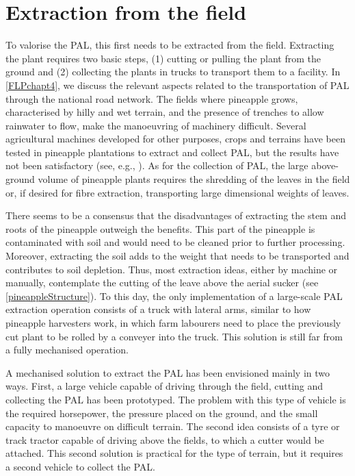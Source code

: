 \section{Extraction from the field}

To valorise the PAL, this first needs to be extracted from the field. Extracting the plant requires two basic steps, (1) cutting or pulling the plant from the ground and (2) collecting the plants in trucks to transport them to a facility. In \cref{FLPchapt4}, we discuss the relevant aspects related to the transportation of PAL through the national road network. The fields where pineapple grows, characterised by hilly and wet terrain, and the presence of trenches to allow rainwater to flow, make the manoeuvring of machinery difficult. Several agricultural machines developed for other purposes, crops and terrains have been tested in pineapple plantations to extract and collect PAL, but the results have not been satisfactory (see, e.g., \cite{monniAnanas}). As for the collection of PAL, the large above-ground volume of pineapple plants requires the shredding of the leaves in the field or, if desired for fibre extraction, transporting large dimensional weights of leaves. 

There seems to be a consensus that the disadvantages of extracting the stem and roots of the pineapple outweigh the benefits. This part of the pineapple is contaminated with soil and would need to be cleaned prior to further processing. Moreover, extracting the soil adds to the weight that needs to be transported and contributes to soil depletion. Thus, most extraction ideas, either by machine or manually, contemplate the cutting of the leave above the aerial sucker (see \cref{pineappleStructure}). To this day, the only implementation of a large-scale PAL extraction operation consists of a truck with lateral arms, similar to how pineapple harvesters work, in which farm labourers need to place the previously cut plant to be rolled by a conveyer into the truck. This solution is still far from a fully mechanised operation.

A mechanised solution to extract the PAL has been envisioned mainly in two ways. First, a large vehicle capable of driving through the field, cutting and collecting the PAL has been prototyped. The problem with this type of vehicle is the required horsepower, the pressure placed on the ground, and the small capacity to manoeuvre on difficult terrain. The second idea consists of a tyre or track tractor capable of driving above the fields, to which a cutter would be attached. This second solution is practical for the type of terrain, but it requires a second vehicle to collect the PAL.

